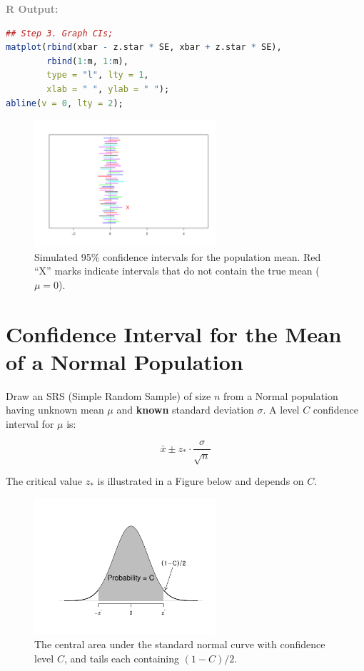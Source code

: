 \vspace{1em}
\textcolor{gray}{\textbf{R Output:}}

\begin{lstlisting}[language=R]
## Step 3. Graph CIs;
matplot(rbind(xbar - z.star * SE, xbar + z.star * SE),
        rbind(1:m, 1:m),
        type = "l", lty = 1,
        xlab = " ", ylab = " ");
abline(v = 0, lty = 2);
\end{lstlisting}

\begin{figure}[h!]
  \centering
  \includegraphics[width=0.6\textwidth]{Section6/confidence_intervals.pdf}
  \caption{Simulated 95\% confidence intervals for the population mean. Red “X” marks indicate intervals that do not contain the true mean (\( \mu = 0 \)).}
\end{figure}


\vspace{2em}

\section*{Confidence Interval for the Mean of a Normal Population}

Draw an SRS (Simple Random Sample) of size $n$ from a Normal population having unknown mean $\mu$ and \textbf{known} standard deviation $\sigma$. A level $C$ confidence interval for $\mu$ is:

\[
\bar{x} \pm z_{\ast} \cdot \frac{\sigma}{\sqrt{n}}
\]

The critical value $z_{\ast}$ is illustrated in a Figure below and depends on $C$.

\begin{figure}[h!]
  \centering
  \includegraphics[width=0.6\textwidth]{Section6/normal_confidence_curve.pdf}
  \caption{The central area under the standard normal curve with confidence level \( C \), and tails each containing \( (1 - C)/2 \).}
\end{figure}

